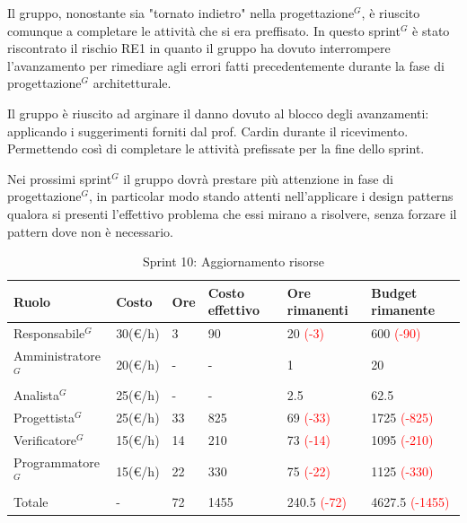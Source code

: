 Il gruppo, nonostante sia "tornato indietro" nella progettazione$^G$, è riuscito comunque a completare le attività che si era preffisato.
In questo sprint$^G$ è stato riscontrato il rischio RE1 in quanto il gruppo ha dovuto interrompere l'avanzamento per rimediare agli errori fatti precedentemente durante la fase di progettazione$^G$ architetturale.

Il gruppo è riuscito ad arginare il danno dovuto al blocco degli avanzamenti: applicando i suggerimenti forniti dal prof. Cardin durante il ricevimento. 
Permettendo così di completare le attività prefissate per la fine dello sprint.

Nei prossimi sprint$^G$ il gruppo dovrà prestare più attenzione in fase di progettazione$^G$, in particolar modo stando attenti nell'applicare i design patterns qualora si presenti l'effettivo problema che essi mirano a risolvere, senza forzare il pattern dove non è necessario.

\begin{table}[H]
	\centering
	\begin{tabular}{|p{}|p{}|p{}|p{}|p{}|p{}|}
		\hline
		\rowcolor{gray!25}
		Ruolo & Costo & Ore & Costo \newline effettivo & Ore \newline rimanenti & Budget \newline rimanente \\ \hline
		
		Responsabile$^G$
		& 30(€/h) & 3 & 90
		& 20 \textcolor{red}{(-3)}
		& 600 \textcolor{red}{(-90)} \\ \hline
		
		Amministratore$^G$
		& 20(€/h) & - & -
		& 1
		& 20 \\ \hline
		
		Analista$^G$
		& 25(€/h) & - & -
		& 2.5
		& 62.5\\ \hline
		
		Progettista$^G$
		& 25(€/h) & 33 & 825
		& 69 \textcolor{red}{(-33)}
		& 1725 \textcolor{red}{(-825)}\\ \hline
		
		Verificatore$^G$
		& 15(€/h) & 14 & 210
		& 73 \textcolor{red}{(-14)}
		& 1095 \textcolor{red}{(-210)} \\ \hline
		
		Programmatore$^G$
		& 15(€/h) & 22 & 330
		& 75 \textcolor{red}{(-22)}
		& 1125 \textcolor{red}{(-330)} \\ \hline
		
		Totale
		& - & 72 & 1455
		& 240.5 \textcolor{red}{(-72)}
		& 4627.5 \textcolor{red}{(-1455)} \\ \hline
	\end{tabular}
	\caption{Sprint 10: Aggiornamento risorse}
\end{table}